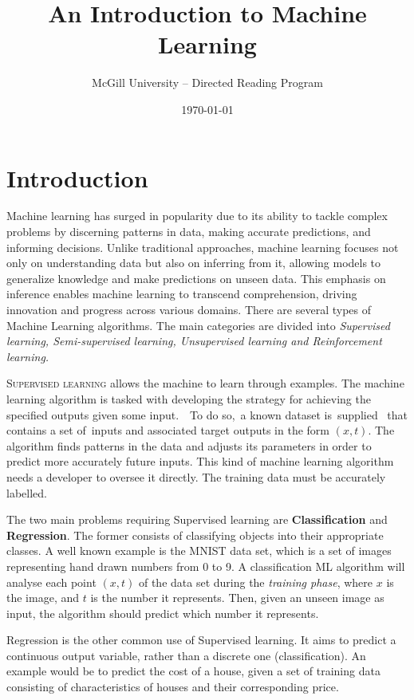 \documentclass[nobib]{tufte-handout} %
\title{An Introduction to Machine Learning}
\date{\today}
\author{McGill University -- Directed Reading Program}
\makeatletter
\renewcommand{\maketitlepage}{%
\begingroup%
\setlength{\parindent}{0pt}

{\fontsize{24}{24}\selectfont\textit{\@author}\par}

\vspace{1.75in}{\fontsize{36}{54}\selectfont\@title\par}

\vspace{0.5in}{\fontsize{14}{14}\selectfont\textsf{\smallcaps{\@date}}\par}

\vspace{0.5in}\usebox{\titleimage}

\vfill{\fontsize{14}{14}\selectfont\textit{\@publisher}\par}

\thispagestyle{empty}
\endgroup
\newpage
}
\makeatother
\begin{document}
\maketitlepage%

\tableofcontents
\newpage

\section{Introduction}
 
Machine learning has surged in popularity due to its ability to tackle complex problems by discerning patterns in data, making accurate predictions, and informing decisions. Unlike traditional approaches, machine learning focuses not only on understanding data but also on inferring from it, allowing models to generalize knowledge and make predictions on unseen data. This emphasis on inference enables machine learning to transcend comprehension, driving innovation and progress across various domains. There are several types of Machine Learning algorithms. The main categories are divided into \textit{Supervised learning, Semi-supervised learning, Unsupervised learning and Reinforcement learning.}

\vspace{4mm}
  \noindent \textsc{Supervised learning} allows the machine to learn through examples. The machine learning algorithm is tasked with developing the strategy for achieving the specified outputs given some input.  To do so, a known dataset is supplied  that contains a set of inputs and associated target outputs in the form $(x, t)$. The algorithm finds patterns in the data and adjusts its parameters in order to predict more accurately future inputs. This kind of machine learning algorithm needs a developer to oversee it directly. The training data must be accurately labelled. 

  The two main problems requiring Supervised learning are \textbf{Classification} and \textbf{Regression}. The former consists of classifying objects into their appropriate classes. A well known example is the MNIST data set, which is a set of images representing hand drawn numbers from 0 to 9. A classification ML algorithm will analyse each point $(x,t)$ of the data set during the \textit{training phase}, where $x$ is the image, and $t$ is the number it represents. Then, given an unseen image as input, the algorithm should predict which number it represents.

  Regression is the other common use of Supervised learning. It aims to predict a continuous output variable, rather than a discrete one (classification). An example would be to predict the cost of a house, given a set of training data consisting of characteristics of houses and their corresponding price.
\end{document}
